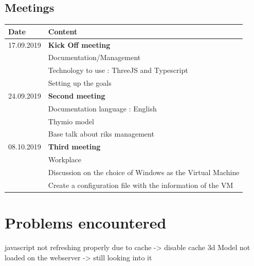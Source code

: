 \documentclass{scrartcl}
\begin{document}
\subsection{Meetings}
\begin{tabular}{ | m{3cm} | m{10cm} | }
  \hline
  Date & Content \\
  \hline
  17.09.2019 & \textbf{Kick Off meeting}\\
  & Documentation/Management\\
  & Technology to use : ThreeJS and Typescript\\
  & Setting up the goals\\
  \hline
  24.09.2019 & \textbf{Second meeting} \\
  & Documentation language : English \\
  & Thymio model \\
  & Base talk about riks management \\
  \hline
  08.10.2019 & \textbf{Third meeting}\\
  & Workplace\\
  & Discussion on the choice of Windows as the Virtual Machine \\
  & Create a configuration file with the information of the VM \\
  \hline
\end{tabular}

\listoffigures

\listoftables

\section{Problems encountered}
javascript not refreshing properly due to cache -> disable cache
3d Model not loaded on the webserver -> still looking into it

\printbibliography[heading=bibintoc]
\end{document}
